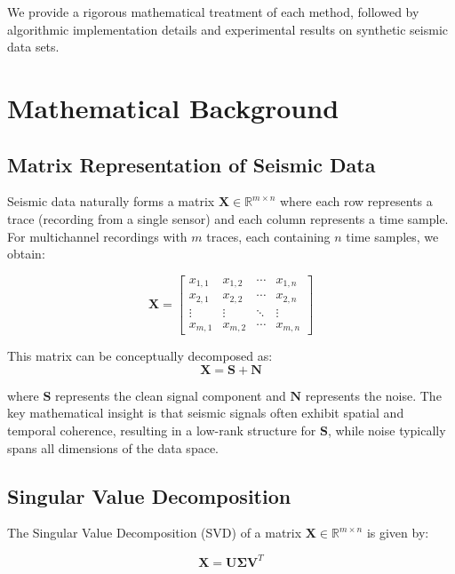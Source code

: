 \documentclass[10pt,twocolumn]{article}
\begin{document}
We provide a rigorous mathematical treatment of each method, followed by algorithmic implementation details and experimental results on synthetic seismic data sets.

\section{Mathematical Background}
\subsection{Matrix Representation of Seismic Data}

Seismic data naturally forms a matrix $\mathbf{X} \in \mathbb{R}^{m \times n}$ where each row represents a trace (recording from a single sensor) and each column represents a time sample. For multichannel recordings with $m$ traces, each containing $n$ time samples, we obtain:

\begin{equation}
\mathbf{X} = 
\begin{bmatrix}
x_{1,1} & x_{1,2} & \cdots & x_{1,n} \\
x_{2,1} & x_{2,2} & \cdots & x_{2,n} \\
\vdots & \vdots & \ddots & \vdots \\
x_{m,1} & x_{m,2} & \cdots & x_{m,n}
\end{bmatrix}
\end{equation}

This matrix can be conceptually decomposed as:
\begin{equation}
\mathbf{X} = \mathbf{S} + \mathbf{N}
\end{equation}

where $\mathbf{S}$ represents the clean signal component and $\mathbf{N}$ represents the noise. The key mathematical insight is that seismic signals often exhibit spatial and temporal coherence, resulting in a low-rank structure for $\mathbf{S}$, while noise typically spans all dimensions of the data space.

\subsection{Singular Value Decomposition}
The Singular Value Decomposition (SVD) of a matrix $\mathbf{X} \in \mathbb{R}^{m \times n}$ is given by:

\begin{equation}
\mathbf{X} = \mathbf{U} \mathbf{\Sigma} \mathbf{V}^T
\end{equation}
\end{document}
